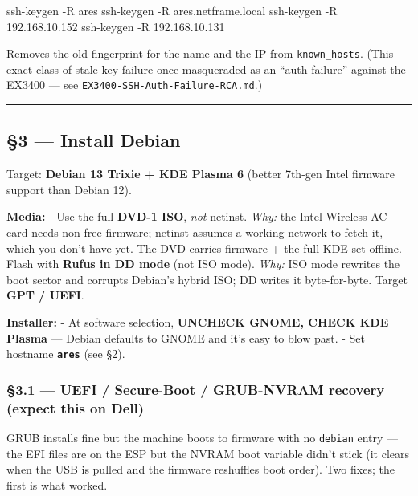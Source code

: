 \documentclass[
]{article}
\newenvironment{Shaded}{\begin{snugshade}}{\end{snugshade}}
\newcommand{\AttributeTok}[1]{\textcolor[rgb]{0.77,0.63,0.00}{#1}}
\newcommand{\FunctionTok}[1]{\textcolor[rgb]{0.00,0.00,0.00}{#1}}
\newcommand{\NormalTok}[1]{#1}
\begin{document}
\begin{Shaded}
\begin{Highlighting}[]
\FunctionTok{ssh{-}keygen} \AttributeTok{{-}R}\NormalTok{ ares}
\FunctionTok{ssh{-}keygen} \AttributeTok{{-}R}\NormalTok{ ares.netframe.local}
\FunctionTok{ssh{-}keygen} \AttributeTok{{-}R}\NormalTok{ 192.168.10.152}
\FunctionTok{ssh{-}keygen} \AttributeTok{{-}R}\NormalTok{ 192.168.10.131}
\end{Highlighting}
\end{Shaded}

Removes the old fingerprint for the name and the IP from
\texttt{known\_hosts}. (This exact class of stale-key failure once
masqueraded as an ``auth failure'' against the EX3400 --- see
\texttt{EX3400-SSH-Auth-Failure-RCA.md}.)

\begin{center}\rule{0.5\linewidth}{0.5pt}\end{center}

\hypertarget{install-debian}{%
\subsection{§3 --- Install Debian}\label{install-debian}}

Target: \textbf{Debian 13 Trixie + KDE Plasma 6} (better 7th-gen Intel
firmware support than Debian 12).

\textbf{Media:} - Use the full \textbf{DVD-1 ISO}, \emph{not} netinst.
\emph{Why:} the Intel Wireless-AC card needs non-free firmware; netinst
assumes a working network to fetch it, which you don't have yet. The DVD
carries firmware + the full KDE set offline. - Flash with \textbf{Rufus
in DD mode} (not ISO mode). \emph{Why:} ISO mode rewrites the boot
sector and corrupts Debian's hybrid ISO; DD writes it byte-for-byte.
Target \textbf{GPT / UEFI}.

\textbf{Installer:} - At software selection, \textbf{UNCHECK GNOME,
CHECK KDE Plasma} --- Debian defaults to GNOME and it's easy to blow
past. - Set hostname \textbf{\texttt{ares}} (see §2).

\hypertarget{uefi-secure-boot-grub-nvram-recovery-expect-this-on-dell}{%
\subsubsection{§3.1 --- UEFI / Secure-Boot / GRUB-NVRAM recovery (expect
this on
Dell)}\label{uefi-secure-boot-grub-nvram-recovery-expect-this-on-dell}}

GRUB installs fine but the machine boots to firmware with no
\texttt{debian} entry --- the EFI files are on the ESP but the NVRAM
boot variable didn't stick (it clears when the USB is pulled and the
firmware reshuffles boot order). Two fixes; the first is what worked.
\end{document}
